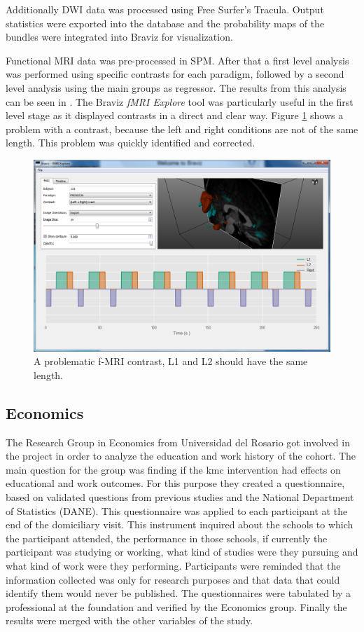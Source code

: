 Additionally DWI data was processed using Free Surfer's Tracula. Output statistics were exported into the database and the probability maps of the bundles were integrated into Braviz for visualization. 

Functional MRI data was pre-processed in SPM.  After that a first level analysis was performed using specific contrasts for each paradigm, followed by a second level analysis using the main groups as regressor. The results from this analysis can be seen in \autocite{PABLO_FELIPE}. The Braviz \emph{fMRI Explore} tool was particularly useful in the first level stage as it displayed contrasts in a direct and clear way. Figure \ref{fig_spm_contrast_error} shows a problem with a contrast, because the left and right conditions are not of the same length. This problem was quickly identified and corrected.

\begin{figure}
	\centering
		\includegraphics{figures/kmc400/erroro_fmri2}
	\caption{A problematic f-MRI contrast, L1 and L2 should have the same length.}
	\label{fig_spm_contrast_error}
\end{figure}
 

\subsection{Economics}

The Research Group in Economics from Universidad del Rosario got involved in the project in order to analyze the education and work history of the cohort. The main question for the group was finding if the kmc intervention had effects on educational and work outcomes.  For this purpose they created a questionnaire, based on validated questions from previous studies and the National Department of Statistics (DANE). This questionnaire was applied to each participant at the end of the domiciliary visit. This instrument inquired about the schools to which the participant attended, the performance in those schools, if currently the participant was studying or working, what kind of studies were they pursuing and what kind of work were they performing. Participants were reminded that the information collected was only for research purposes and that data that could identify them would never be published. The questionnaires were tabulated by a professional at the foundation and verified by the Economics group. Finally the results were merged with the other variables of the study.

